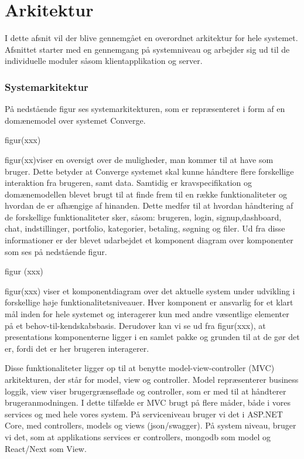 \chapter{Arkitektur}
I dette afsnit vil der blive gennemgået en overordnet arkitektur for hele systemet. Afsnittet starter med en gennemgang på  systemniveau og arbejder sig ud til de individuelle moduler såsom klientapplikation og server.  

\subsection{Systemarkitektur}
På nedstående figur ses systemarkitekturen, som er repræsenteret i form af en domænemodel over systemet Converge.

figur(xxx)

figur(xx)viser en oversigt over de muligheder, man kommer til at have som bruger. Dette betyder at Converge systemet
skal kunne håndtere flere forskellige interaktion fra brugeren, samt data. Samtidig er kravspecifikation og domænemodellen
blevet brugt til at finde frem til en række funktionaliteter og hvordan de er afhængige af hinanden. Dette
medfør til at hvordan håndtering af de forskellige funktionaliteter sker, såsom: brugeren, login, signup,dashboard,
chat, indstillinger, portfolio, kategorier, betaling, søgning og filer. Ud fra disse informationer er der blevet udarbejdet
et komponent diagram over komponenter som ses på nedstående figur.

figur (xxx)

figur(xxx) viser et komponentdiagram over det aktuelle system under udvikling i forskellige høje funktionalitetsniveauer.
Hver komponent er ansvarlig for et klart mål inden for hele systemet og interagerer kun med andre væsentlige
elementer på et behov-til-kendskabsbasis. Derudover kan vi se ud fra figur(xxx), at presentations komponenterne
ligger i en samlet pakke og grunden til at de gør det er, fordi det er her brugeren interagerer.

Disse funktionaliteter ligger op til at benytte model-view-controller (MVC) arkitekturen, der står for model, view og
controller. Model repræsenterer business loggik, view viser brugergrænseflade og controller, som er med til at håndterer
brugeranmodningen. I dette tilfælde er MVC brugt på flere måder, både i vores services og med hele vores
system. På serviceniveau bruger vi det i ASP.NET Core, med controllers, models og views (json/swagger). På system
niveau, bruger vi det, som at applikations services er controllers, mongodb som model og React/Next som
View.

